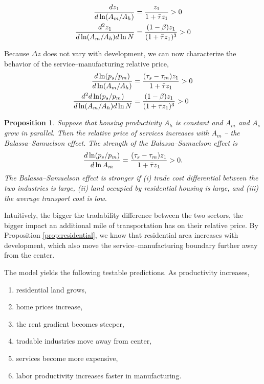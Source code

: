 \documentclass[12pt]{article}
\newtheorem{proposition}{Proposition}
\begin{document}
\begin{align*}
 \frac{d z_1}{d\ln(A_m/A_h)} &= \frac{z_1}{1+\Bar\tau z_1}>0\\
\frac{d^2 z_1}{d\ln(A_m/A_h) d \ln N} &= \frac{(1-\beta)z_1}{(1+\Bar\tau z_1)^3}>0
\end{align*}

Because $\Delta z$ does not vary with development, we can now characterize the behavior of the service--manufacturing relative price,
\begin{align*}
 \frac{d \ln(p_s/p_m)}{d\ln(A_m/A_h)} &= \frac{(\tau_s-\tau_m)z_1}{1+\Bar\tau z_1}>0\\
\frac{d^2 d \ln(p_s/p_m)}{d\ln(A_m/A_h) d \ln N} &= \frac{(1-\beta)z_1}{(1+\Bar\tau z_1)^3}>0
\end{align*}


\begin{proposition}
Suppose that housing productivity $A_h$ is constant and $A_m$ and $A_s$ grow in parallel. Then the relative price of services increases with $A_m$ -- the Balassa--Samuelson effect. The strength of the Balassa--Samuelson effect is
\begin{equation}\label{eq:bscs}
\frac{d \ln(p_s/p_m)}{d\ln A_m} = \frac{(\tau_s-\tau_m)z_1}{1+\Bar\tau z_1}>0.
\end{equation}
The Balassa--Samuelson effect is stronger if (i) trade cost differential between the two industries is large, (ii) land occupied by residential housing is large, and (iii) the average transport cost is low.
\end{proposition}
Intuitively, the bigger the tradability difference between the two sectors, the bigger impact an additional mile of transportation has on their relative price. By Proposition \ref{prop:residential}, we know that residential area increases with development, which also move the service--manufacturing boundary further away from the center. 

The model yields the following testable predictions.
As productivity increases,
\begin{enumerate}
    \item residential land grows,
    \item home prices increase,
    \item the rent gradient becomes steeper,
    \item tradable industries move away from center,
    \item services become more expensive,
    \item labor productivity increases faster in manufacturing.
\end{enumerate}
\end{document}
